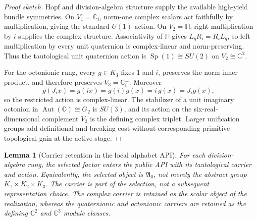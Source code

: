 \documentclass[11pt]{article}
\theoremstyle{plain}
\newtheorem{lemma}[theorem]{Lemma}
\theoremstyle{definition}
\theoremstyle{remark}
\newenvironment{proofsketch}{\begin{proof}[Proof sketch]}{\end{proof}}
\newcommand{\Aut}{\operatorname{Aut}}
\newcommand{\C}{\mathbb{C}}
\newcommand{\HH}{\mathbb{H}}
\newcommand{\OO}{\mathbb{O}}
\begin{document}
\begin{proofsketch}
Hopf and division-algebra structure supply the available high-yield bundle
symmetries.  On \(V_1=\C_i\), norm-one complex scalars act faithfully by
multiplication, giving the standard \(U(1)\)-action.  On \(V_2=\HH\), right
multiplication by \(i\) supplies the complex structure.  Associativity of
\(\HH\) gives \(L_qR_i=R_iL_q\), so left multiplication by every unit
quaternion is complex-linear and norm-preserving.  Thus the tautological unit
quaternion action is \(\operatorname{Sp}(1)\cong SU(2)\) on
\(V_2\cong\C^2\).

For the octonionic rung, every \(g\in K_3\) fixes \(1\) and \(i\), preserves
the norm inner product, and therefore preserves
\(V_3=\C_i^\perp\).  Moreover
\[
g(J_i x)=g(ix)=g(i)g(x)=i\,g(x)=J_i g(x),
\]
so the restricted action is complex-linear.  The stabilizer of a unit
imaginary octonion in \(\Aut(\OO)\cong G_2\) is \(SU(3)\), and its action on
the six-real-dimensional complement \(V_3\) is the defining complex triplet.
Larger unification groups add definitional and breaking cost without
corresponding primitive topological gain at the active stage.
\end{proofsketch}

\begin{lemma}[Carrier retention in the local alphabet API]
For each division-algebra rung, the selected factor enters the public API
with its tautological carrier and action.  Equivalently, the selected object is
\(\mathfrak A_0\), not merely the abstract group
\(K_1\times K_2\times K_3\).  The carrier is part of the selection, not a
subsequent representation choice.  The complex carrier is retained as the
scalar object of the realization, whereas the quaternionic and octonionic
carriers are retained as the defining \(\C^2\) and \(\C^3\) module clauses.
\end{lemma}
\end{document}
